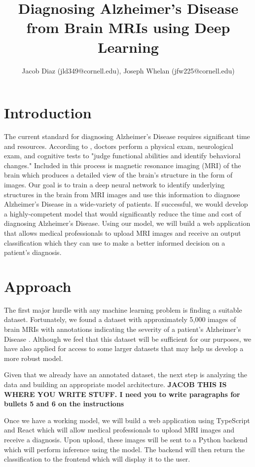 \documentclass[10pt]{article}
\title{Diagnosing Alzheimer's Disease from Brain MRIs using Deep Learning}
\author{Jacob Diaz (jld349@cornell.edu), Joseph Whelan (jfw225@cornell.edu)}
\begin{document}
 
	
	\maketitle
	
	\section{Introduction}
	The current standard for diagnosing Alzheimer's Disease requires significant time and resources. According to \cite[Mayo Clinic]{alz_desc}, doctors perform a physical exam, neurological exam, and cognitive tests to 
	"judge functional abilities and identify behavioral changes." Included in this process is magnetic resonance imaging (MRI) of the brain which produces a detailed view of the brain's structure in the form of images.
	Our goal is to train a deep neural network to identify underlying structures in the brain from MRI images and use this information to diagnose Alzheimer's Disease in a wide-variety of patients. If successful, we would develop a highly-competent model that would significantly reduce the time and cost of diagnosing Alzheimer's Disease. Using our model, we will build a web application that allows medical professionals to upload  
	MRI images and receive an output classification which they can use to make a better informed decision on a patient's diagnosis.

	\section{Approach}
	The first major hurdle with any machine learning problem is finding a suitable dataset. Fortunately, we found a dataset with approximately 5,000 images of brain MRIs with annotations indicating the severity of a patient's Alzheimer's Disease \citep{kaggle_dset}. Although we feel that this dataset will be sufficient for our purposes, we have also applied for access to some larger datasets that may help us develop a more robust model.

	Given that we already have an annotated dataset, the next step is analyzing the data and building an appropriate model architecture.
	\textbf{JACOB THIS IS WHERE YOU WRITE STUFF. I need you to write paragraphs for bullets 5 and 6 on the instructions}

	Once we have a working model, we will build a web application using TypeScript and React which will allow medical professionals to upload MRI images and receive a diagnosis. Upon upload, these images will be sent to a Python backend which will perform inference using the model. The backend will then return the classification to the frontend which will display it to the user.
\end{document}
